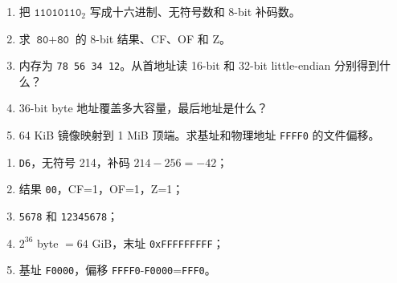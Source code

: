 
\begin{enumerate}[leftmargin=2.2em]
  \item 把 \(\texttt{11010110}_2\) 写成十六进制、无符号数和 8-bit 补码数。
  \item 求 \(\texttt{80}+\texttt{80}\) 的 8-bit 结果、CF、OF 和 Z。
  \item 内存为 \texttt{78 56 34 12}。从首地址读 16-bit 和 32-bit
    little-endian 分别得到什么？
  \item 36-bit byte 地址覆盖多大容量，最后地址是什么？
  \item 64 KiB 镜像映射到 1 MiB 顶端。求基址和物理地址
    \texttt{FFFF0} 的文件偏移。
\end{enumerate}

\begin{answerbox}
\begin{enumerate}[leftmargin=2.2em]
  \item \texttt{D6}，无符号 214，补码 \(214-256=-42\)；
  \item 结果 \texttt{00}，CF=1，OF=1，Z=1；
  \item \texttt{5678} 和 \texttt{12345678}；
  \item \(2^{36}\) byte \(=64\) GiB，末址 \texttt{0xFFFFFFFFF}；
  \item 基址 \texttt{F0000}，偏移
    \texttt{FFFF0}-\texttt{F0000}=\texttt{FFF0}。
\end{enumerate}
\end{answerbox}
